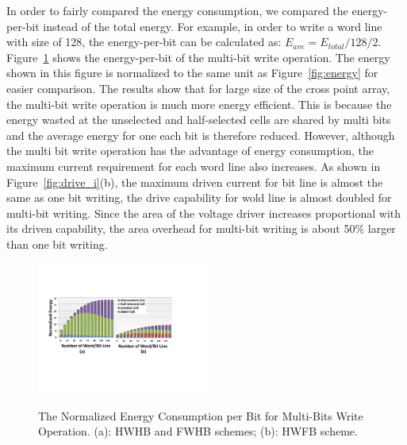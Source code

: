 In order to fairly compared the energy consumption, we compared the energy-per-bit instead of the total energy. For example, in order to write a word line with size of 128, the energy-per-bit can be calculated as:
$E_{ave}=E_{total}/128/2$. Figure~\ref{fig:multi_energy} shows the energy-per-bit of the multi-bit write operation. The energy shown in this figure is normalized to the same unit as Figure~\ref{fig:energy} for easier comparison. The results show that for large size of the cross point array, the multi-bit write operation is much more energy efficient. This is because the energy wasted at the unselected and half-selected cells are shared by multi bits and the average energy for one each bit is therefore reduced. However, although the multi bit write operation has the advantage of energy consumption, the maximum current requirement for each word line also increases. As shown in Figure~\ref{fig:drive_i}(b), the maximum driven current for bit line is almost the same as one bit writing, the drive capability for wold line is almost doubled for multi-bit writing. Since the area of the voltage driver increases proportional with its driven capability, the area overhead for multi-bit writing is about 50\% larger than one bit writing.

\begin{figure}%
\centering
  \includegraphics[width=0.5\textwidth]{./figures/multi_energy2.pdf}\\
  \caption{The Normalized Energy Consumption per Bit for Multi-Bits Write Operation. (a): HWHB and  FWHB schemes; (b): HWFB scheme. }\label{fig:multi_energy}
    \vspace{-10pt}
\end{figure}




